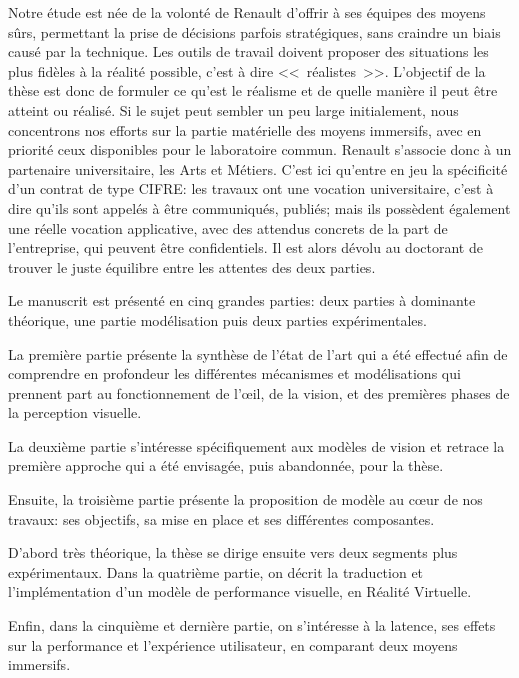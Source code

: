 \par Notre étude est née de la volonté de Renault d'offrir à ses équipes des moyens sûrs, permettant la prise de décisions parfois stratégiques, sans craindre un biais causé par la technique. Les outils de travail doivent proposer des situations les plus fidèles à la réalité possible, c'est à dire <<~réalistes~>>. L'objectif de la thèse est donc de formuler ce qu'est le réalisme et de quelle manière il peut être atteint ou réalisé. Si le sujet peut sembler un peu large initialement, nous concentrons nos efforts sur la partie matérielle des moyens immersifs, avec en priorité ceux disponibles pour le laboratoire commun. Renault s'associe donc à un partenaire universitaire, les Arts et Métiers. C'est ici qu'entre en jeu la spécificité d'un contrat de type CIFRE: les travaux ont une vocation universitaire, c'est à dire qu'ils sont appelés à être communiqués, publiés; mais ils possèdent également une réelle vocation applicative, avec des attendus concrets de la part de l'entreprise, qui peuvent être confidentiels. Il est alors dévolu au doctorant de trouver le juste équilibre entre les attentes des deux parties.

\par Le manuscrit est présenté en cinq grandes parties: deux parties à dominante théorique, une partie modélisation puis deux parties expérimentales.

\par La première partie présente la synthèse de l'état de l'art qui a été effectué afin de comprendre en profondeur les différentes mécanismes et modélisations qui prennent part au fonctionnement de l'œil, de la vision, et des premières phases de la perception visuelle.

\par La deuxième partie s'intéresse spécifiquement aux modèles de vision et retrace la première approche qui a été envisagée, puis abandonnée, pour la thèse.

\par Ensuite, la troisième partie présente la proposition de modèle au cœur de nos travaux: ses objectifs, sa mise en place et ses différentes composantes.

\par D'abord très théorique, la thèse se dirige ensuite vers deux segments plus expérimentaux. Dans la quatrième partie, on décrit la traduction et l'implémentation d'un modèle de performance visuelle, en Réalité Virtuelle.

\par Enfin, dans la cinquième et dernière partie, on s'intéresse à la latence, ses effets sur la performance et l'expérience utilisateur, en comparant deux moyens immersifs.